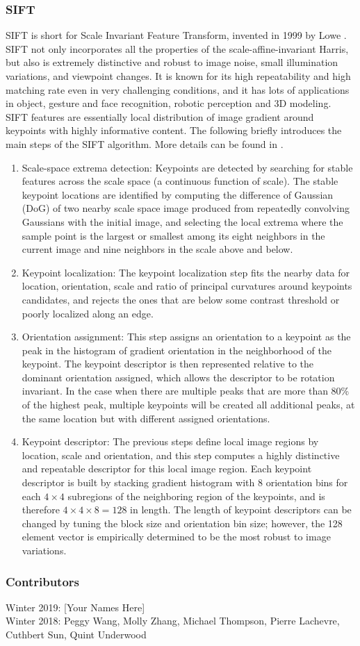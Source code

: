 \documentclass[twoside]{article}
\begin{document}
\subsubsection{SIFT}
SIFT is short for Scale Invariant Feature Transform, invented in 1999 by Lowe \cite{SIFT}. SIFT not only incorporates all the properties of the scale-affine-invariant Harris, but also is extremely distinctive and robust to image noise, small illumination variations, and viewpoint changes. It is known for its high repeatability and high matching rate even in very challenging conditions, and it has lots of applications in object, gesture and face recognition, robotic perception and 3D modeling. SIFT features are essentially local distribution of image gradient around keypoints with highly informative content. The following briefly introduces the main steps of the SIFT algorithm. More details can be found in \cite{SIFT}.
\begin{enumerate}
\item Scale-space extrema detection: Keypoints are detected by searching for stable features across the scale space (a continuous function of scale). The stable keypoint locations are identified by computing the difference of Gaussian (DoG) of two nearby scale space image produced from repeatedly convolving Gaussians with the initial image, and selecting the local extrema where the sample point is the largest or smallest among its eight neighbors in the current image and nine neighbors in the scale above and below.
\item Keypoint localization: The keypoint localization step fits the nearby data for location, orientation, scale and ratio of principal curvatures around keypoints candidates, and rejects the ones that are below some contrast threshold or poorly localized along an edge.
\item Orientation assignment: This step assigns an orientation to a keypoint as the peak in the histogram of gradient orientation in the neighborhood of the keypoint. The keypoint descriptor is then represented relative to the dominant orientation assigned, which allows the descriptor to be rotation invariant. In the case when there are multiple peaks that are more than 80\% of the highest peak, multiple keypoints will be created all additional peaks, at the same location but with different assigned orientations.
\item Keypoint descriptor: The previous steps define local image regions by location, scale and orientation, and this step computes a highly distinctive and repeatable descriptor for this local image region. Each keypoint descriptor is built by stacking gradient histogram with 8 orientation bins for each $4\times 4 $ subregions of the neighboring region of the keypoints, and is therefore $4\times 4 \times 8 = 128$ in length. The length of keypoint descriptors can be changed by tuning the block size and orientation bin size; however, the 128 element vector is empirically determined to be the most robust to image variations.

\end{enumerate}



\subsubsection*{Contributors}
Winter 2019: [Your Names Here]
\\
Winter 2018: Peggy Wang, Molly Zhang, Michael Thompson, Pierre Lachevre, Cuthbert Sun, Quint Underwood
\end{document}
